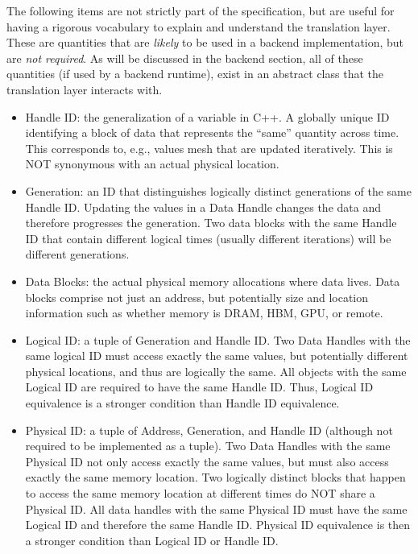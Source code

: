 The following items are not strictly part of the specification, but are useful for having a rigorous vocabulary to explain and understand the translation layer.
These are quantities that are \emph{likely} to be used in a backend implementation, but are \emph{not required}.
As will be discussed in the backend section, all of these quantities (if used by a backend runtime),
exist in an abstract class  that the translation layer interacts with.
\begin{itemize}
\item Handle ID: the generalization of a variable in C++. A globally unique ID identifying a block of data that represents the ``same'' quantity across time.  
This corresponds to, e.g., values mesh that are updated iteratively.  
This is NOT synonymous with an actual physical location.
\item Generation: an ID that distinguishes logically distinct generations of the same Handle ID. 
Updating the values in a Data Handle changes the data and therefore progresses the generation. 
Two data blocks with the same Handle ID that contain different logical times (usually different iterations) will be different generations.
\item Data Blocks: the actual physical memory allocations where data lives. 
Data blocks comprise not just an address, but potentially size and location information such as whether memory is DRAM, HBM, GPU, or remote.
\item Logical ID: a tuple of Generation and Handle ID. 
Two Data Handles with the same logical ID must access exactly the same values, but potentially different physical locations, and thus are logically the same. 
All objects with the same Logical ID are required to have the same Handle ID.
Thus, Logical ID equivalence is a stronger condition than Handle ID equivalence.
\item Physical ID: a tuple of Address, Generation, and Handle ID (although not required to be implemented as a tuple). 
Two Data Handles with the same Physical ID not only access exactly the same values, but must also access exactly the same memory location. 
Two logically distinct blocks that happen to access the same memory location at different times do NOT share a Physical ID. 
All data handles with the same Physical ID must have the same Logical ID and therefore the same Handle ID. 
Physical ID equivalence is then a stronger condition than Logical ID or Handle ID.
\end{itemize}

